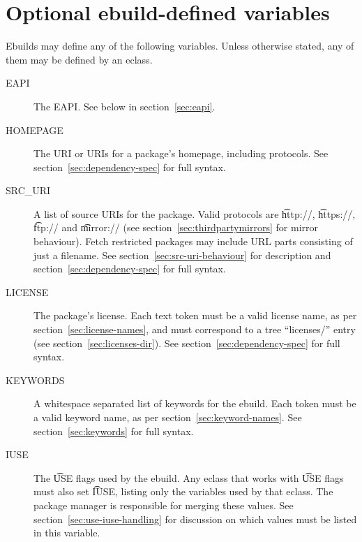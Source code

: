 \section{Optional ebuild-defined variables}
\label{sec:optional-vars}

Ebuilds may define any of the following variables. Unless otherwise stated, any of them may be
defined by an eclass.

\begin{description}
\item[EAPI] The EAPI\@. See below in section~\ref{sec:eapi}.
\item[HOMEPAGE] The URI or URIs for a package's homepage, including protocols.
    See section~\ref{sec:dependency-spec} for full syntax.
\item[SRC_URI] A list of source URIs for the package. Valid protocols are \t{http://},
    \t{https://}, \t{ftp://} and \t{mirror://} (see section~\ref{sec:thirdpartymirrors} for mirror
    behaviour). Fetch restricted packages may include URL parts consisting of just a filename.
    See section~\ref{sec:src-uri-behaviour} for description and section~\ref{sec:dependency-spec}
    for full syntax.
\item[LICENSE] The package's license. Each text token must be a valid license name, as per
    section~\ref{sec:license-names}, and must correspond to a tree ``licenses/'' entry
    (see section~\ref{sec:licenses-dir}). See section~\ref{sec:dependency-spec} for full syntax.
\item[KEYWORDS] A whitespace separated list of keywords for the ebuild. Each token must be a valid
    keyword name, as per section~\ref{sec:keyword-names}. See section~\ref{sec:keywords} for full
    syntax.
\item[IUSE] The \t{USE} flags used by the ebuild. Any eclass that works with \t{USE} flags must
    also set \t{IUSE}, listing only the variables used by that eclass. The package manager is
    responsible for merging these values. See section~\ref{sec:use-iuse-handling} for discussion on
    which values must be listed in this variable.


\end{description}
